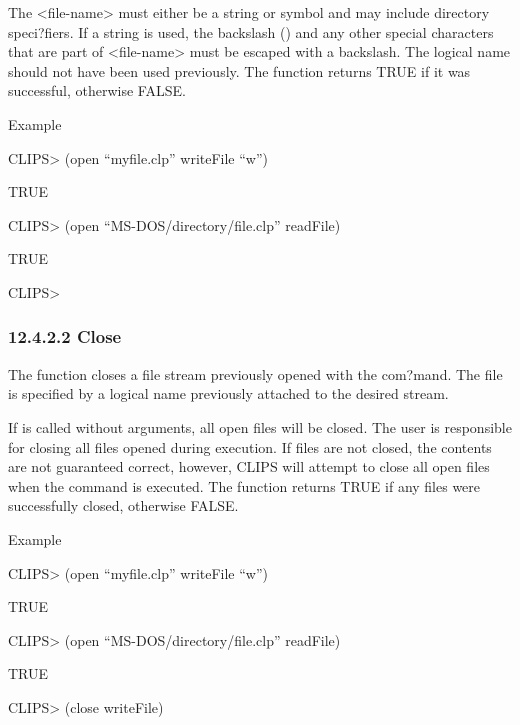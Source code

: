\documentclass[letterpaper,10pt,english]{sphinxmanual}
\begin{document}
The \textless{}file-name\textgreater{} must either be a string or symbol and may include
directory speci?fiers. If a string is used, the backslash () and any
other special characters that are part of \textless{}file-name\textgreater{} must be escaped
with a backslash. The logical name should not have been used previously.
The  function returns TRUE if it was successful, otherwise
FALSE.

Example

CLIPS\textgreater{} (open “myfile.clp” writeFile “w”)

TRUE

CLIPS\textgreater{} (open “MS-DOS/directory/file.clp” readFile)

TRUE

CLIPS\textgreater{}


\subsubsection{12.4.2.2 Close}
\label{\detokenize{actions:close}}
The  function closes a file stream previously opened with the
 com?mand. The file is specified by a logical name previously
attached to the desired stream.


\begin{sphinxVerbatim}[commandchars=\\\{\}]
 \PYG{p}{[}\PYG{p}{]}
\end{sphinxVerbatim}

If  is called without arguments, all open files will be closed.
The user is responsible for closing all files opened during execution.
If files are not closed, the contents are not guaranteed correct,
however, CLIPS will attempt to close all open files when the 
command is executed. The  function returns TRUE if any files
were successfully closed, otherwise FALSE.

Example

CLIPS\textgreater{} (open “myfile.clp” writeFile “w”)

TRUE

CLIPS\textgreater{} (open “MS-DOS/directory/file.clp” readFile)

TRUE

CLIPS\textgreater{} (close writeFile)
\end{document}
